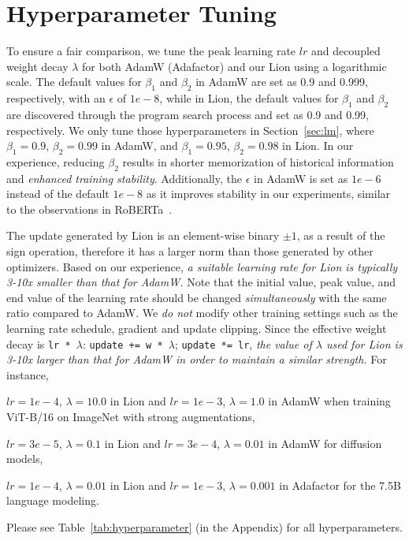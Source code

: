\documentclass{article}
\newcommand{\name}{Lion}
\begin{document}
\section{Hyperparameter Tuning}
\label{sec:tuning}
To ensure a fair comparison, we tune the peak learning rate $lr$ and decoupled weight decay $\lambda$ for both AdamW (Adafactor) and our \name{} using a logarithmic scale.
The default values for $\beta_1$ and $\beta_2$ in AdamW are set as 0.9 and 0.999, respectively, with an $\epsilon$ of $1e-8$, while in \name{}, the default values for $\beta_1$ and $\beta_2$ are discovered through the program search process and set as 0.9 and 0.99, respectively.
We only tune those hyperparameters in Section~\ref{sec:lm},
where $\beta_1=0.9$, $\beta_2=0.99$ in AdamW, and $\beta_1=0.95$, $\beta_2=0.98$ in \name{}.
In our experience, reducing $\beta_2$ results in shorter memorization of historical information and \textit{enhanced training stability}.
Additionally, the $\epsilon$ in AdamW is set as $1e-6$ instead of the default $1e-8$ as it improves stability in our experiments, similar to the observations in RoBERTa~\citep{liu2019roberta}.


The update generated by \name{} is an element-wise binary $\pm 1$, as a result of the sign operation, therefore it has a larger norm than those generated by other optimizers.
Based on our experience, \textit{a suitable learning rate for \name{} is typically 3-10x smaller than that for AdamW.}
Note that the initial value, peak value, and end value of the learning rate should be changed \textit{simultaneously} with the same ratio compared to AdamW.
We \textit{do not} modify other training settings such as the learning rate schedule, gradient and update clipping. 
Since the effective weight decay is \texttt{lr * $\lambda$}: \texttt{update += w * $\lambda$}; \texttt{update *= lr},
\textit{the value of $\lambda$ used for \name{} is 3-10x larger than that for AdamW in order to maintain a similar strength.}
For instance, 
\begin{compactitem}
    \item $lr=1e-4$, $\lambda=10.0$ in \name{} and $lr=1e-3$, $\lambda=1.0$ in AdamW when training ViT-B/16 on ImageNet with strong augmentations,
    \item $lr=3e-5$, $\lambda=0.1$ in \name{} and $lr=3e-4$, $\lambda=0.01$ in AdamW for diffusion models,
    \item $lr=1e-4$, $\lambda=0.01$ in \name{} and $lr=1e-3$, $\lambda=0.001$ in Adafactor for the 7.5B language modeling. 
\end{compactitem}
Please see Table~\ref{tab:hyperparameter} (in the Appendix) for all hyperparameters.
\end{document}
